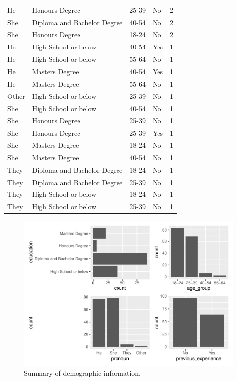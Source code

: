 \documentclass[]{interact}
\theoremstyle{plain}%
\theoremstyle{definition}
\theoremstyle{remark}
\begin{document}
\begin{table}
\begin{tabular}[t]{llllr}
He & Honours Degree & 25-39 & No & 2\\
She & Diploma and Bachelor Degree & 40-54 & No & 2\\
She & Honours Degree & 18-24 & No & 2\\
He & High School or below & 40-54 & Yes & 1\\
He & High School or below & 55-64 & No & 1\\
He & Masters Degree & 40-54 & Yes & 1\\
He & Masters Degree & 55-64 & No & 1\\
Other & High School or below & 25-39 & No & 1\\
She & High School or below & 40-54 & No & 1\\
She & Honours Degree & 25-39 & No & 1\\
She & Honours Degree & 25-39 & Yes & 1\\
She & Masters Degree & 18-24 & No & 1\\
She & Masters Degree & 40-54 & No & 1\\
They & Diploma and Bachelor Degree & 18-24 & No & 1\\
They & Diploma and Bachelor Degree & 25-39 & No & 1\\
They & High School or below & 18-24 & No & 1\\
They & High School or below & 25-39 & No & 1\\
\bottomrule
\end{tabular}
\end{table}

\begin{figure}
\centering
\includegraphics{paper_comparison_files/figure-latex/demographic-summary-plot-1.pdf}
\caption{Summary of demographic information.
\label{fig:demographic-summary-plot}}
\end{figure}
\end{document}
